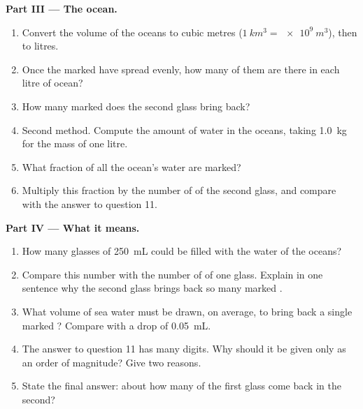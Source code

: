 \begin{problem}
\medskip
\noindent\textbf{Part III --- The ocean.}
\begin{enumerate}[resume]
  \item Convert the volume of the oceans to cubic metres
        ($\qty{1}{km^3} = \qty{e9}{m^3}$), then to litres.
  \item Once the marked  have spread evenly, how many of them
        are there in each litre of ocean?
  \item How many marked  does the second glass bring back?
  \item Second method. Compute the amount of water in the oceans, taking
        \qty{1.0}{kg} for the mass of one litre.
  \item What fraction of all the ocean's water  are marked?
  \item Multiply this fraction by the number of  of the second
        glass, and compare with the answer to question 11.
\end{enumerate}

\medskip
\noindent\textbf{Part IV --- What it means.}
\begin{enumerate}[resume]
  \item How many glasses of \qty{250}{mL} could be filled with the water
        of the oceans?
  \item Compare this number with the number of  of one glass.
        Explain in one sentence why the second glass brings back so many
        marked .
  \item What volume of sea water must be drawn, on average, to bring
        back a single marked ? Compare with a drop of
        \qty{0.05}{mL}.
  \item The answer to question 11 has many digits. Why should it be given
        only as an order of magnitude? Give two reasons.
  \item State the final answer: about how many  of the first
        glass come back in the second?
\end{enumerate}
\end{problem}
